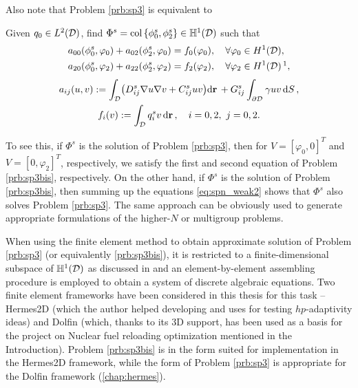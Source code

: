 Also note that Problem \ref{prb:sp3} is equivalent to
\begin{problembis}\label{prb:sp3bis}
Given $q_0 \in \Lp[2](\VV)$, find $\Phi^s = \col \{\phi^s_0, \phi^s_2\} \in \mathbb{H}^1(\VV)$ such that
\begin{equation}\label{eq:spn_weak2}
\begin{gathered}
\begin{aligned}
	a_{00}(\phi^s_0, \varphi_0) + a_{02}(\phi^s_2, \varphi_0) &= f_0(\varphi_0),\quad \forall \varphi_0\in H^1(\VV),\\
	a_{20}(\phi^s_0, \varphi_2) + a_{22}(\phi^s_2, \varphi_2) &= f_2(\varphi_2),\quad \forall \varphi_2\in H^1(\VV)\,
	\footnotemark,
\end{aligned}\\[.3em] 
	a_{ij}(u,v) := \int_{\VV} \bigl({D}^s_{ij}\nabla u \nabla v +
	C^s_{ij} u v \bigr)\d{\br} + G^s_{ij} \int_{\pV} \gamma u v
	\,\d{S},\\
 	f_i(v) := \int_{\VV}q^s_i v\,\d{\br},\quad i = 0,2,\ j = 0,2.
\end{gathered} 
\end{equation}
\end{problembis}%
%
To see this, if $\Phi^s$ is
the solution of Problem \ref{prb:sp3}, then for $V = [\varphi_0,0]^T$ and $V =[0,\varphi_2]^T$, respectively, we satisfy
the first and second equation of Problem \ref*{prb:sp3bis}, respectively. On the other hand, if $\Phi^s$ is the solution
of Problem \ref*{prb:sp3bis}, then summing up the equations \eqref{eq:spn_weak2} shows that $\Phi^s$ also solves Problem
\ref{prb:sp3}.  The same approach can be obviously used to generate appropriate formulations of the higher-$N$ or 
multigroup problems.

When using the finite element method to obtain approximate solution of Problem \ref{prb:sp3} (or equivalently
\ref{prb:sp3bis}), it is restricted to a finite-dimensional subspace of $\mathbb{H}^1(\VV)$ as discussed
in  and an element-by-element assembling procedure is employed to obtain a system of discrete algebraic
equations. Two finite element frameworks have been considered in this thesis for this task --
Hermes2D (which the author helped developing and uses for testing $hp$-adaptivity ideas) and Dolfin (which, thanks to
its 3D support, has been used as a basis for the project on Nuclear fuel reloading optimization mentioned in the
Introduction). Problem \ref{prb:sp3bis} is in the form suited for implementation in the Hermes2D framework, while the
form of Problem \ref{prb:sp3} is appropriate for the Dolfin framework (\cref{chap:hermes}).

